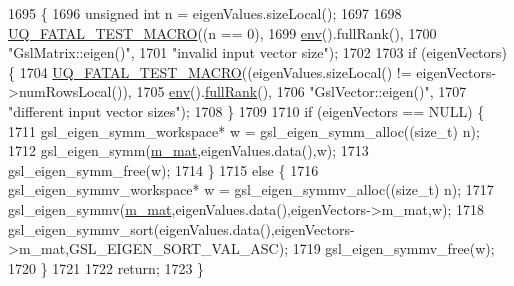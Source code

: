 \begin{DoxyCode}
1695 \{
1696   \textcolor{keywordtype}{unsigned} \textcolor{keywordtype}{int} n = eigenValues.sizeLocal();
1697 
1698   \hyperlink{_defines_8h_a56d63d18d0a6d45757de47fcc06f574d}{UQ\_FATAL\_TEST\_MACRO}((n == 0),
1699                       \hyperlink{class_q_u_e_s_o_1_1_matrix_a1eefeca9f35200e8275fb0fdfa0c8684}{env}().fullRank(),
1700                       \textcolor{stringliteral}{"GslMatrix::eigen()"},
1701                       \textcolor{stringliteral}{"invalid input vector size"});
1702 
1703   \textcolor{keywordflow}{if} (eigenVectors) \{
1704     \hyperlink{_defines_8h_a56d63d18d0a6d45757de47fcc06f574d}{UQ\_FATAL\_TEST\_MACRO}((eigenValues.sizeLocal() != eigenVectors->numRowsLocal()),
1705                         \hyperlink{class_q_u_e_s_o_1_1_matrix_a1eefeca9f35200e8275fb0fdfa0c8684}{env}().\hyperlink{class_q_u_e_s_o_1_1_base_environment_a84a239e42ae443cf71db6e03e8159620}{fullRank}(),
1706                         \textcolor{stringliteral}{"GslVector::eigen()"},
1707                         \textcolor{stringliteral}{"different input vector sizes"});
1708   \}
1709 
1710   \textcolor{keywordflow}{if} (eigenVectors == NULL) \{
1711     gsl\_eigen\_symm\_workspace* w = gsl\_eigen\_symm\_alloc((\textcolor{keywordtype}{size\_t}) n);
1712     gsl\_eigen\_symm(\hyperlink{class_q_u_e_s_o_1_1_gsl_matrix_a2cac0bd065e280a06445f944d5f3e3b3}{m\_mat},eigenValues.data(),w);
1713     gsl\_eigen\_symm\_free(w);
1714   \}
1715   \textcolor{keywordflow}{else} \{
1716     gsl\_eigen\_symmv\_workspace* w = gsl\_eigen\_symmv\_alloc((\textcolor{keywordtype}{size\_t}) n);
1717     gsl\_eigen\_symmv(\hyperlink{class_q_u_e_s_o_1_1_gsl_matrix_a2cac0bd065e280a06445f944d5f3e3b3}{m\_mat},eigenValues.data(),eigenVectors->m\_mat,w);
1718     gsl\_eigen\_symmv\_sort(eigenValues.data(),eigenVectors->m\_mat,GSL\_EIGEN\_SORT\_VAL\_ASC);
1719     gsl\_eigen\_symmv\_free(w);
1720   \}
1721 
1722   \textcolor{keywordflow}{return};
1723 \}
\end{DoxyCode}
